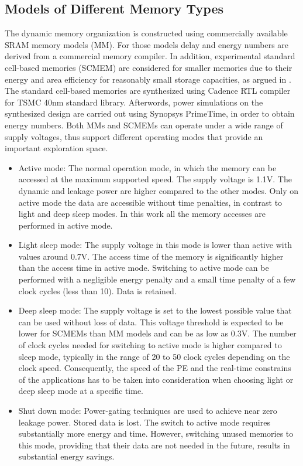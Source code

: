 \subsection{Models of Different Memory Types}
The dynamic memory organization is constructed using commercially available SRAM memory models (MM).
For those models delay and energy numbers are derived from a commercial memory compiler.
In addition, experimental standard cell-based memories (SCMEM) \cite{Mei11}  are  considered for smaller memories due to their energy and area efficiency for reasonably small storage capacities, as argued in \cite{Mei10}. 
The standard cell-based memories are synthesized using Cadence RTL compiler for TSMC 40nm standard library. 
Afterwords, power simulations on the synthesized design are carried out using Synopsys PrimeTime, in order to obtain energy numbers.
Both MMs and SCMEMs can operate under a wide range of supply voltages, thus support different operating modes that provide an important exploration space.
\begin{itemize}
\item Active mode: The normal operation mode, in which the memory can be accessed at the maximum supported speed. The supply voltage is 1.1V. 
The dynamic and leakage power are higher compared to the other modes.
Only on active mode the data are accessible without time penalties, in contrast to light and deep sleep modes.
In this work all the memory accesses are performed in active mode. 
\item Light sleep mode: The supply voltage in this mode is lower than active with values around 0.7V. 
The access time of the memory is significantly higher than the access time in active mode. 
Switching to active mode can be performed with a negligible energy penalty and a small time penalty of a few clock cycles (less than 10). 
Data is retained.  
\item Deep sleep mode: The supply voltage is set to the lowest possible value that can be used without loss of data. 
This voltage threshold is expected to be lower for SCMEMs than MM models and can be as low as 0.3V. 
The number of clock cycles needed for switching to active mode is higher compared to sleep mode, typically in the range of 20 to 50 clock cycles depending on the clock speed. 
Consequently, the speed of the PE and the real-time constrains of the applications has to be taken into consideration when choosing light or deep sleep mode at a specific time.  
\item Shut down mode: Power-gating techniques are used to achieve near zero leakage power. 
Stored data is lost. 
The switch to active mode requires substantially more energy and time. 
However, switching unused memories to this mode, providing that their data are not needed in the future, results in substantial energy savings.
\end{itemize}  

